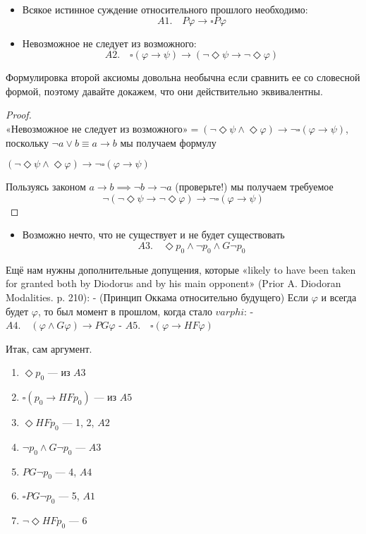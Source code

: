 \documentclass[openany]{book}
\theoremstyle{plain}
\theoremstyle{definition}
\begin{document}
\begin{itemize}
\item Всякое истинное суждение относительного прошлого необходимо:
    \[A1. \quad P\varphi \to \square P\varphi \]
\item Невозможное не следует из возможного:
    \[A2. \quad \square(\varphi \to \psi) \to (\neg \Diamond \psi \to \neg \Diamond \varphi)\]
\end{itemize}

Формулировка второй аксиомы довольна необычна если сравнить ее со словесной формой, поэтому давайте докажем, что они действительно эквивалентны.
\begin{proof}

\(\text{«Невозможное не следует из возможного»} = (\neg \Diamond \psi \land \Diamond \varphi) \to \neg \square (\varphi \to \psi)\), поскольку \(\neg a \lor b \equiv a \to b\) мы получаем формулу

\((\neg \Diamond \psi \land \Diamond \varphi) \to \neg \square (\varphi \to \psi)\)

Пользуясь законом \(a \to b \implies \neg b \to \neg a\) (проверьте!) мы получаем требуемое
$$\neg(\neg \Diamond \psi \to \neg \Diamond \varphi) \to \neg \square (\varphi \to \psi)$$
\end{proof}
\begin{itemize}
\item Возможно нечто, что не существует и не будет существовать
    \[A3. \quad \Diamond p_0 \land \neg p_0 \land G\neg p_0\]
 \end{itemize}

Ещё нам нужны дополнительные допущения, которые «likely to have been taken for granted both by Diodorus and by his main opponent» (Prior A. Diodoran Modalities. p. 210):
- (Принцип Оккама относительно будущего) Если \(\varphi\) и всегда будет \(\varphi\), то был момент в прошлом, когда стало \(varphi\):
    - \(A4. \quad (\varphi \land G \varphi) \to PG\varphi\) 
- \(A5. \quad \square(\varphi \to HF \varphi)\)

Итак, сам аргумент.
\begin{enumerate}
\item \(\Diamond p_0\) — из \(A3\)
\item \(\square(p_0 \to HF p_0)\) — из \(A5\)
\item \(\Diamond HF p_0\) — 1, 2, \(A2\)
\item \(\neg p_0 \land G \neg p_0\) — \(A3\)
\item \(PG \neg p_0\) — 4, \(A4\)
\item \(\square PG \neg p_0\) — 5, \(A1\)
\item \(\neg \Diamond HF p_0\) — 6
\end{enumerate}
\end{document}
